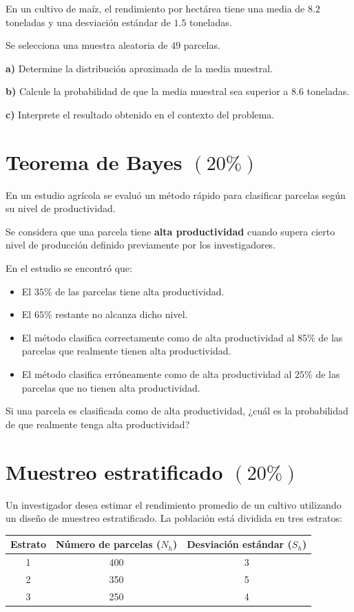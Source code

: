 \documentclass[12pt]{article}
\begin{document}
En un cultivo de maíz, el rendimiento por hectárea tiene una media de $8.2$ toneladas y una desviación estándar de $1.5$ toneladas.

Se selecciona una muestra aleatoria de $49$ parcelas.

\textbf{a)} Determine la distribución aproximada de la media muestral.

\textbf{b)} Calcule la probabilidad de que la media muestral sea superior a $8.6$ toneladas.

\textbf{c)} Interprete el resultado obtenido en el contexto del problema.


\section{Teorema de Bayes $(20\%)$}

En un estudio agrícola se evaluó un método rápido para clasificar parcelas según su nivel de productividad.

Se considera que una parcela tiene \textbf{alta productividad} cuando supera cierto nivel de producción definido previamente por los investigadores.

En el estudio se encontró que:

\begin{itemize}
    \item El $35\%$ de las parcelas tiene alta productividad.
    \item El $65\%$ restante no alcanza dicho nivel.
    \item El método clasifica correctamente como de alta productividad al $85\%$ de las parcelas que realmente tienen alta productividad.
    \item El método clasifica erróneamente como de alta productividad al $25\%$ de las parcelas que no tienen alta productividad.
\end{itemize}

Si una parcela es clasificada como de alta productividad, ¿cuál es la probabilidad de que realmente tenga alta productividad?


\section{Muestreo estratificado $(20\%)$}

Un investigador desea estimar el rendimiento promedio de un cultivo utilizando un diseño de muestreo estratificado. La población está dividida en tres estratos:

\begin{table}[H]
\centering
\begin{tabular}{ccc}
\hline
\textbf{Estrato} & \textbf{Número de parcelas ($N_h$)} & \textbf{Desviación estándar ($S_h$)} \\
\hline
1 & 400 & 3 \\
2 & 350 & 5 \\
3 & 250 & 4 \\
\hline
\end{tabular}
\end{table}
\end{document}
